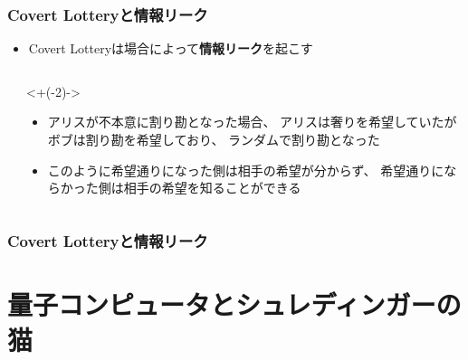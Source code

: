 \begin{frame}
  \frametitle{Covert Lotteryと情報リーク}

  \begin{itemize}
    \item Covert Lotteryは場合によって\textbf{情報リーク}を起こす
  \end{itemize}

  \begin{columns}
    \begin{column}{0.6\textwidth}

    \end{column}
    \begin{column}{0.4\textwidth}
      \uncover<+(-2)->{
        \begin{itemize}
          \item アリスが不本意に割り勘となった場合、
          アリスは奢りを希望していたがボブは割り勘を希望しており、
          ランダムで割り勘となった

          \item<2-> このように希望通りになった側は相手の希望が分からず、
          希望通りにならかった側は相手の希望を知ることができる
        \end{itemize}
      }
    \end{column}
  \end{columns}
\end{frame}

\begin{frame}
  \frametitle{Covert Lotteryと情報リーク}


  \pause
\end{frame}

\section{量子コンピュータとシュレディンガーの猫}

